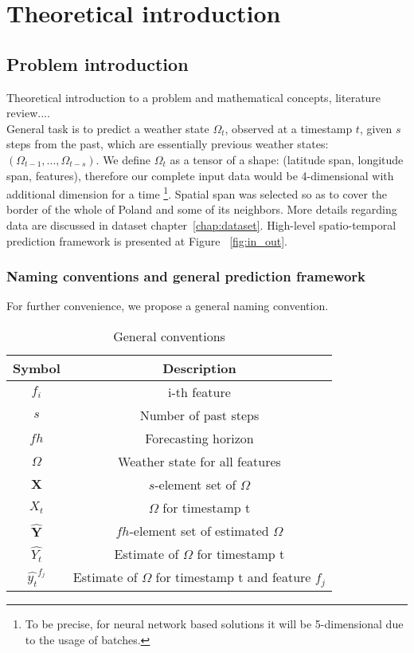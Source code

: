 \chapter{Theoretical introduction}
	
\section{Problem introduction}
 Theoretical introduction to a problem and mathematical concepts, literature review.... \\
 
\noindent General task is to predict a weather state $\Omega_t$, observed at a timestamp $t$, given $s$ steps from the past, which are essentially previous weather states: $(\Omega_{t-1}, ..., \Omega_{t-s})$. We define $\Omega_t$ as a tensor of a shape: (latitude span, longitude span, features), therefore our complete input data would be 4-dimensional with additional dimension for a time \footnote{To be precise, for neural network based solutions it will be 5-dimensional due to the usage of batches.}. Spatial span was selected so as to cover the border of the whole of Poland and some of its neighbors. More details regarding data are discussed in dataset chapter~\ref{chap:dataset}. High-level spatio-temporal prediction framework is presented at Figure ~\ref{fig:in_out}. \\


\newpage
\subsection{Naming conventions and general prediction framework}
 For further convenience, we propose a general naming convention. 
 \begin{table}[!h]
    \centering
     \begin{tabular}{|c|c|}
        \hline
        Symbol & Description \\
        \hline
        $f_i$ & i-th feature \\
        $s$ & Number of past steps \\
        $fh$ & Forecasting horizon \\
        $\Omega$ & Weather state for all features \\
        $\mathbf{X}$ & $s$-element set of $\Omega$  \\
        $X_t$ & $\Omega$ for timestamp t\\
        $\mathbf{\hat{Y}}$ & $fh$-element set of estimated $\Omega$ \\
        $\hat{Y_t}$ & Estimate of $\Omega$ for timestamp t \\
        $\hat{y_t}^{f_j}$ & Estimate of $\Omega$ for timestamp t and feature $f_j$ \\
        \hline
    \end{tabular}
    \caption{General conventions}
 \end{table}
 
